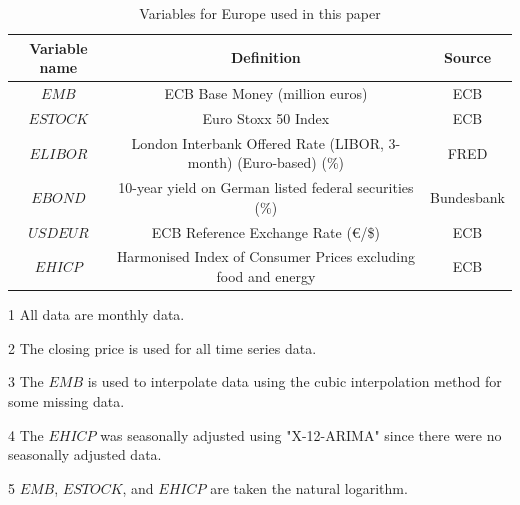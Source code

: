 \documentclass[12pt]{article}
\begin{document}
\vspace{80pt}

\begin{table}[H]
    \centering
    \caption{Variables for Europe used in this paper}
    \vspace{10pt}
    \begin{threeparttable}
        \begin{tabular}{ccc} \toprule[0.5pt]\toprule[0.5pt]
            Variable name & Definition                                                       & Source     \\ \midrule[0.5pt]
            $EMB$         & ECB Base Money (million euros)                                   & ECB        \\
            $ESTOCK$      & Euro Stoxx 50 Index                                              & ECB        \\
            $ELIBOR$      & London Interbank Offered Rate (LIBOR, 3-month) (Euro-based) (\%) & FRED       \\
            $EBOND$       & 10-year yield on German listed federal securities (\%)           & Bundesbank \\
            $USDEUR$      & ECB Reference Exchange Rate (\euro /\$)                          & ECB        \\
            $EHICP$       & Harmonised Index of Consumer Prices excluding food and energy    & ECB        \\
            \bottomrule[0.5pt]\bottomrule[0.5pt]
        \end{tabular}
        \vspace{10pt}
        \begin{tablenotes}\footnotesize
            \item[1] All data are monthly data.
            \item[2] The closing price is used for all time series data.
            \item[3] The $EMB$ is used to interpolate data using the cubic interpolation method for some missing data.
            \item[4] The $EHICP$ was seasonally adjusted using "X-12-ARIMA" since there were no seasonally adjusted data.
            \item[5] $EMB$, $ESTOCK$, and $EHICP$ are taken the natural logarithm.
        \end{tablenotes}
    \end{threeparttable}
\end{table}
\end{document}

